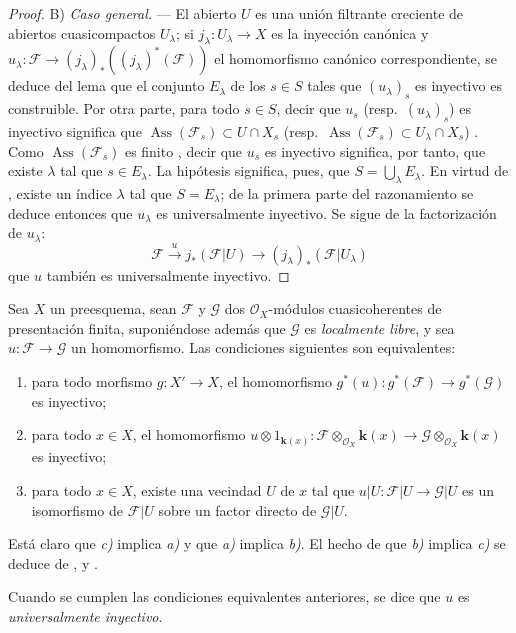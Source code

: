 \begin{proof}
B) \emph{Caso general.} --- El abierto $U$ es una unión filtrante creciente de abiertos cuasicompactos $U_\lambda$; si $j_\lambda:U_\lambda\to X$ es la inyección canónica y $u_\lambda:\mathcal F\to(j_\lambda)_*((j_\lambda)^*(\mathcal F))$ el homomorfismo canónico correspondiente, se deduce del lema  que el conjunto $E_\lambda$ de los $s\in S$ tales que $(u_\lambda)_s$ es inyectivo es construible.
Por otra parte, para todo $s\in S$, decir que $u_s$ (resp.\ $(u_\lambda)_s$) es inyectivo significa que $\operatorname{Ass}(\mathcal F_s)\subset U\cap X_s$ (resp.\ $\operatorname{Ass}(\mathcal F_s)\subset U_\lambda\cap X_s$) .
Como $\operatorname{Ass}(\mathcal F_s)$ es finito , decir que $u_s$ es inyectivo significa, por tanto, que existe $\lambda$ tal que $s\in E_\lambda$.
La hipótesis significa, pues, que $S=\bigcup_\lambda E_\lambda$.
En virtud de , existe un índice $\lambda$ tal que $S=E_\lambda$; de la primera parte del razonamiento se deduce entonces que $u_\lambda$ es universalmente inyectivo.
Se sigue de la factorización de $u_\lambda$:
\[
\mathcal F\xrightarrow{u}j_*(\mathcal F|U)\longrightarrow
(j_\lambda)_*(\mathcal F|U_\lambda)
\]
que $u$ también es universalmente inyectivo.
\end{proof}

\begin{remarks}[11.9.18]
\label{IV.11.9.18}
Sea $X$ un preesquema, sean $\mathcal F$ y $\mathcal G$ dos $\mathcal O_X$-módulos cuasicoherentes de presentación finita, suponiéndose además que $\mathcal G$ es \emph{localmente libre}, y sea $u:\mathcal F\to\mathcal G$ un homomorfismo.
Las condiciones siguientes son equivalentes:
\begin{enumerate}[label=\emph{\alph*)}]
  \item para todo morfismo $g:X'\to X$, el homomorfismo $g^*(u):g^*(\mathcal F)\to g^*(\mathcal G)$ es inyectivo;
  \item para todo $x\in X$, el homomorfismo $u\otimes 1_{\mathbf{k}(x)}:\mathcal F\otimes_{\mathcal O_X}\boldsymbol{k}(x)
  \to\mathcal G\otimes_{\mathcal O_X}\boldsymbol{k}(x)$ es inyectivo;
  \item para todo $x\in X$, existe una vecindad $U$ de $x$ tal que $u|U:\mathcal F|U\to\mathcal G|U$ es un isomorfismo de $\mathcal F|U$ sobre un factor directo de $\mathcal G|U$.
\end{enumerate}

Está claro que \emph{c)} implica \emph{a)} y que \emph{a)} implica \emph{b)}.
El hecho de que \emph{b)} implica \emph{c)} se deduce de ,  y .

Cuando se cumplen las condiciones equivalentes anteriores, se dice que $u$ es \emph{universalmente inyectivo}.
\end{remarks}

